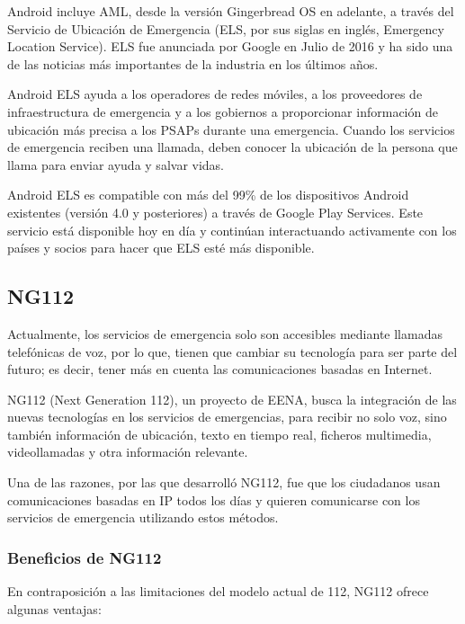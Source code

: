 Android incluye AML, desde la versión Gingerbread OS en adelante, a través del Servicio de Ubicación de Emergencia (ELS, por sus siglas en inglés, Emergency Location Service). ELS fue anunciada por Google en Julio de 2016 y ha sido una de las noticias más importantes de la industria en los últimos años.

Android ELS ayuda a los operadores de redes móviles, a los proveedores de infraestructura de emergencia y a los gobiernos a proporcionar información de ubicación más precisa a los PSAPs durante una emergencia. Cuando los servicios de emergencia reciben una llamada, deben conocer la ubicación de la persona que llama para enviar ayuda y salvar vidas.

Android ELS es compatible con más del 99\% de los dispositivos Android existentes (versión 4.0 y posteriores) a través de Google Play Services. Este servicio está disponible hoy en día y continúan interactuando activamente con los países y socios para hacer que ELS esté más disponible.

\subsection{NG112}

Actualmente, los servicios de emergencia solo son accesibles mediante llamadas telefónicas de voz, por lo que, tienen que cambiar su tecnología para ser parte del futuro; es decir, tener más en cuenta las comunicaciones basadas en Internet.

NG112 (Next Generation 112), un proyecto de EENA, busca la integración de las nuevas tecnologías en los servicios de emergencias, para recibir no solo voz, sino también información de ubicación, texto en tiempo real, ficheros multimedia, videollamadas y otra información relevante.

Una de las razones, por las que desarrolló NG112, fue que los ciudadanos usan comunicaciones basadas en IP todos los días y quieren comunicarse con los servicios de emergencia utilizando estos métodos.

\subsubsection{Beneficios de NG112}

En contraposición a las limitaciones del modelo actual de 112, NG112 ofrece algunas ventajas:


